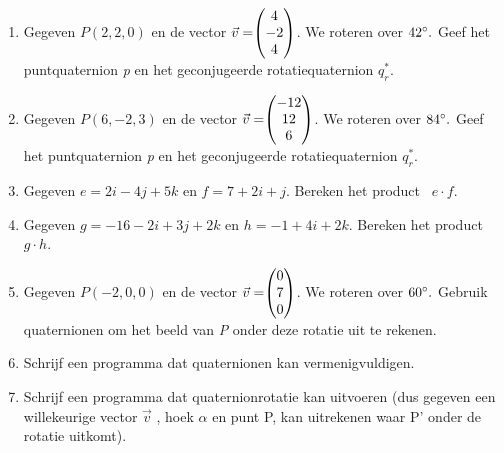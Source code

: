 \begin{enumerate}
	\item Gegeven $ P (2,2,0) $ en de vector $\vec{v} = \vecdrie{4}{-2}{4} $. 
	We roteren over $ 42\degree. $ Geef het puntquaternion \textit{p} en het geconjugeerde rotatiequaternion  $  q_r^* $. 
	
	\item Gegeven $ P (6,-2,3) $ en de vector $\vec{v} = \vecdrie{-12}{12}{6} $. 
	We roteren over $ 84\degree. $ Geef het puntquaternion \textit{p} en het geconjugeerde rotatiequaternion  $  q_r^* $. 
	
	\item Gegeven $ e = 2i-4j+5k$ en   $ f = 7+2i+j $. 
	Bereken het product \ $  e\cdot f $.
	
	\item Gegeven $ g = -16 -2i+3j+2k $ en   $ h = -1+4i+2k $. 
	Bereken het product \ $  g\cdot h $.
	
	\item  Gegeven $ P (-2, 0, 0) $ en de vector $\vec{v} = \vecdrie{0}{7}{0} $. 
	We roteren over $ 60\degree. $ Gebruik quaternionen om het beeld van \textit{P }onder deze rotatie uit te rekenen.   
	
	\item Schrijf een programma dat quaternionen kan vermenigvuldigen.   
	
	\item Schrijf een programma dat quaternionrotatie kan uitvoeren (dus gegeven een willekeurige vector $\vec{v} $ , hoek $ \alpha $ en punt P, kan uitrekenen waar P' onder de rotatie uitkomt).      
	
\end{enumerate}


